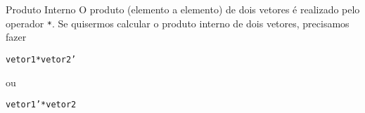 \documentclass[hyperref={pdfpagelabels=false}]{beamer}
\begin{document}
\begin{frame}{Produto Interno}
  O produto (elemento a elemento) de dois vetores é realizado pelo operador {\texttt{*}}. Se quisermos calcular o produto interno de dois vetores, precisamos fazer
  \begin{center} {\texttt{vetor1*vetor2'}} \end{center}
  ou
  \begin{center} {\texttt{vetor1'*vetor2}} \end{center}
\end{frame}
\end{document}
